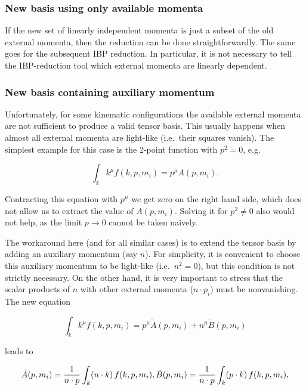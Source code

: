 \documentclass[../FeynCalcManual.tex]{subfiles}
\begin{document}
\subsubsection{New basis using only available
momenta}\label{new-basis-using-only-available-momenta}

If the new set of linearly independent momenta is just a subset of the
old external momenta, then the reduction can be done straightforwardly.
The same goes for the subsequent IBP reduction. In particular, it is not
necessary to tell the IBP-reduction tool which external momenta are
linearly dependent.

\subsubsection{New basis containing auxiliary
momentum}\label{new-basis-containing-auxiliary-momentum}

Unfortunately, for some kinematic configurations the available external
momenta are not sufficient to produce a valid tensor basis. This usually
happens when almost all external momenta are light-like (i.e.~their
squares vanish). The simplest example for this case is the 2-point
function with \(p^2=0\), e.g.~

\begin{equation}
\int_k k^{\mu} f(k,p,m_i) = p^\mu A(p,m_i).
\end{equation}

Contracting this equation with \(p^{\mu}\) we get zero on the right hand
side, which does not allow us to extract the value of \(A(p,m_i)\).
Solving it for \(p^2 \neq 0\) also would not help, as the limit
\(p \to 0\) cannot be taken naively.

The workaround here (and for all similar cases) is to extend the tensor
basis by adding an auxiliary momentum (say \(n\)). For simplicity, it is
convenient to choose this auxiliary momentum to be light-like
(i.e.~\(n^2=0\)), but this condition is not strictly necessary. On the
other hand, it is very important to stress that the scalar products of
\(n\) with other external momenta (\(n \cdot p_i\)) must be
nonvanishing. The new equation

\begin{equation}
\int_k k^{\mu} f(k,p,m_i) = p^\mu \tilde{A}(p,m_i) + n^\mu \tilde{B}(p,m_i)
\end{equation}

leads to

\begin{equation}
\tilde{A}(p,m_i) = \frac{1}{n \cdot p} \int_k (n \cdot k) \, f(k,p,m_i), \\
\tilde{B}(p,m_i) = \frac{1}{n \cdot p} \int_k (p \cdot k) \, f(k,p,m_i),
\end{equation}
\end{document}
